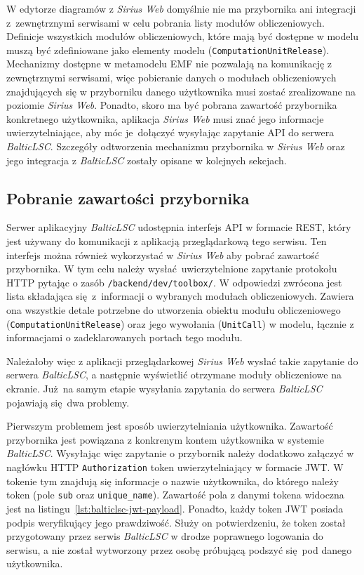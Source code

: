 W edytorze diagramów z \emph{Sirius Web} domyślnie nie ma przybornika ani
integracji z~zewnętrznymi serwisami w celu pobrania listy modułów
obliczeniowych. Definicje wszystkich modułów obliczeniowych, które mają być
dostępne w modelu muszą być zdefiniowane jako
elementy modelu (\texttt{ComputationUnitRelease}). Mechanizmy dostępne w
metamodelu \gls{EMF} nie pozwalają na komunikację z zewnętrznymi serwisami,
więc pobieranie danych o modułach obliczeniowych znajdujących się w przyborniku
danego użytkownika musi zostać zrealizowane na poziomie \emph{Sirius Web}.
Ponadto, skoro ma być pobrana zawartość przybornika konkretnego użytkownika,
aplikacja \emph{Sirius Web} musi znać jego informacje uwierzytelniające, aby
móc je~dołączyć wysyłając zapytanie \gls{API} do serwera \emph{BalticLSC}.
Szczegóły odtworzenia
mechanizmu przybornika w \emph{Sirius Web} oraz jego integracja z
\emph{BalticLSC} zostały opisane w kolejnych sekcjach.

\subsection{Pobranie zawartości
	przybornika}\label{sec:pobranie-zawartosci-przybornika}

Serwer aplikacyjny \emph{BalticLSC} udostępnia interfejs \gls{API} w formacie
\gls{REST}, który jest używany do komunikacji z aplikacją przeglądarkową tego
serwisu. Ten interfejs można również wykorzystać w \emph{Sirius Web} aby pobrać
zawartość przybornika. W tym celu należy wysłać uwierzytelnione zapytanie
protokołu \gls{HTTP} pytając o zasób \texttt{/backend/dev/toolbox/}. W
odpowiedzi zwrócona jest lista składająca się z~informacji o wybranych modułach
obliczeniowych. Zawiera ona wszystkie detale potrzebne do utworzenia obiektu
modułu obliczeniowego (\texttt{ComputationUnitRelease}) oraz jego wywołania
(\texttt{UnitCall}) w modelu, łącznie z informacjami o zadeklarowanych portach
tego modułu.

Należałoby więc z aplikacji przeglądarkowej \emph{Sirius Web} wysłać takie
zapytanie do serwera \emph{BalticLSC}, a następnie wyświetlić otrzymane moduły
obliczeniowe na ekranie. Już na samym etapie wysyłania zapytania do serwera
\emph{BalticLSC} pojawiają się dwa problemy.

Pierwszym problemem jest sposób uwierzytelniania użytkownika. Zawartość
przybornika jest powiązana z konkrenym kontem użytkownika w systemie
\emph{BalticLSC}. Wysyłając więc zapytanie o przybornik należy dodatkowo
załączyć w nagłówku \gls{HTTP} \texttt{Authorization}
token uwierzytelniający w formacie \gls{JWT}. W tokenie tym znajdują się
informacje o nazwie użytkownika, do którego należy token (pole \texttt{sub}
oraz \texttt{unique\_name}). Zawartość pola z
danymi tokena widoczna jest na listingu~\ref{lst:balticlsc-jwt-payload}.
Ponadto, każdy token \gls{JWT} posiada podpis weryfikujący jego prawdziwość.
Służy on potwierdzeniu, że token został przygotowany przez serwis
\emph{BalticLSC} w drodze poprawnego logowania do serwisu, a nie został
wytworzony przez osobę próbującą podszyć się pod danego użytkownika.

